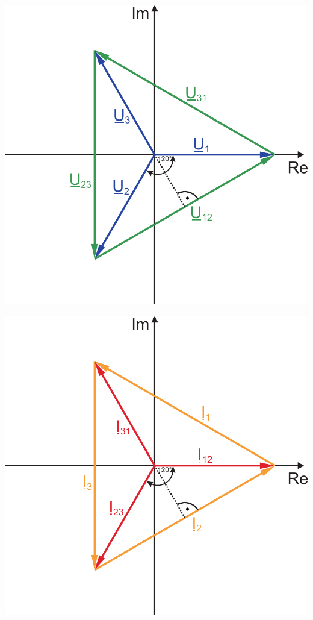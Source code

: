 \documentclass[a4paper,twocolumn,10pt]{article}
\begin{document}
\begin{center}
\includegraphics[width=0.8\columnwidth]{Grafiken/Drehstrom_Zeigerdiagramm}
\end{center}
\begin{center}
\includegraphics[width=0.8\columnwidth]{Grafiken/Drehstrom_Zeigerdiagramm_Strom}
\end{center}
\end{document}
